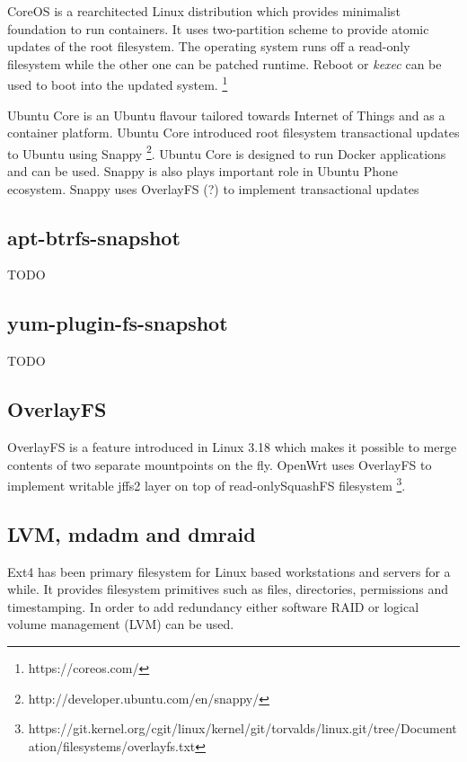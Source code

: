 \documentclass{article}
\begin{document}
CoreOS is a rearchitected Linux distribution which provides minimalist foundation to run containers.
It uses two-partition scheme to provide atomic updates of the root filesystem.
The operating system runs off a read-only filesystem while the other one can be patched runtime. Reboot or \emph{kexec} can be used to boot into the updated system.
\footnote{https://coreos.com/}

Ubuntu Core is an Ubuntu flavour tailored towards Internet of Things and as a container platform. Ubuntu Core introduced root filesystem transactional updates to Ubuntu using Snappy \footnote{http://developer.ubuntu.com/en/snappy/}. Ubuntu Core is designed to run Docker applications and can be used. Snappy is also plays important role in Ubuntu Phone ecosystem. Snappy uses OverlayFS (?) to implement transactional updates 

\subsection{apt-btrfs-snapshot}

TODO

\subsection{yum-plugin-fs-snapshot}

TODO

\subsection{OverlayFS}

OverlayFS is a feature introduced in Linux 3.18 which makes it possible to merge contents of two separate mountpoints on the fly.
OpenWrt uses OverlayFS to implement writable jffs2 layer on top of read-onlySquashFS filesystem \footnote{https://git.kernel.org/cgit/linux/kernel/git/torvalds/linux.git/tree/Documentation/filesystems/overlayfs.txt}.

\subsection{LVM, mdadm and dmraid}

Ext4 has been primary filesystem for Linux based workstations and servers for a while. It provides filesystem primitives such as files, directories, permissions and timestamping. In order to add redundancy either software RAID or logical volume management (LVM) can be used.
\end{document}
